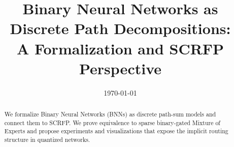 \documentclass[11pt]{article}
\title{Binary Neural Networks as Discrete Path Decompositions: \\
A Formalization and SCRFP Perspective}
\author{}
\date{\today}
\begin{document}
\maketitle

\begin{abstract}
We formalize Binary Neural Networks (BNNs) as discrete path-sum models and connect them to SCRFP. 
We prove equivalence to sparse binary-gated Mixture of Experts and propose experiments and visualizations 
that expose the implicit routing structure in quantized networks.
\end{abstract}

\tableofcontents





\end{document}
